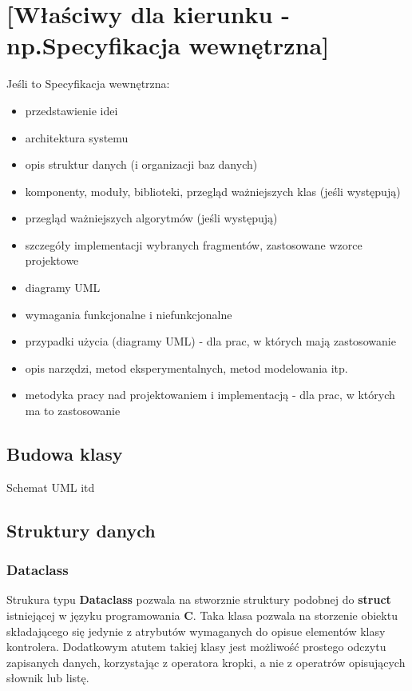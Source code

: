 \chapter{[Właściwy dla kierunku - np.Specyfikacja wewnętrzna]}
Jeśli to Specyfikacja wewnętrzna:
\begin{itemize}
\item przedstawienie idei
\item architektura systemu
\item opis struktur danych (i organizacji baz danych)
\item komponenty, moduły, biblioteki, przegląd ważniejszych klas (jeśli występują)
\item przegląd ważniejszych algorytmów (jeśli występują)
\item szczegóły implementacji wybranych fragmentów, zastosowane wzorce projektowe
\item diagramy UML
\end{itemize}


\begin{itemize}
    \item wymagania funkcjonalne i niefunkcjonalne
    \item przypadki użycia (diagramy UML) - dla prac, w których mają zastosowanie
    \item opis narzędzi, metod eksperymentalnych, metod modelowania itp.
    \item metodyka pracy nad projektowaniem i implementacją - dla prac, w których ma to zastosowanie
    \end{itemize}
    
    \section{Budowa klasy}

    \quad Schemat UML itd

    \section{Struktury danych}
    \subsection{Dataclass}

    \quad Strukura typu \textbf{Dataclass} pozwala na stworznie struktury podobnej do \textbf{struct} istniejącej w języku programowania \textbf{C}. Taka klasa pozwala na storzenie obiektu składającego się jedynie z atrybutów wymaganych do opisue elementów klasy kontrolera. Dodatkowym atutem takiej klasy jest możliwość prostego odczytu zapisanych danych, korzystając z operatora kropki, a nie z operatrów opisujących słownik lub listę. 


